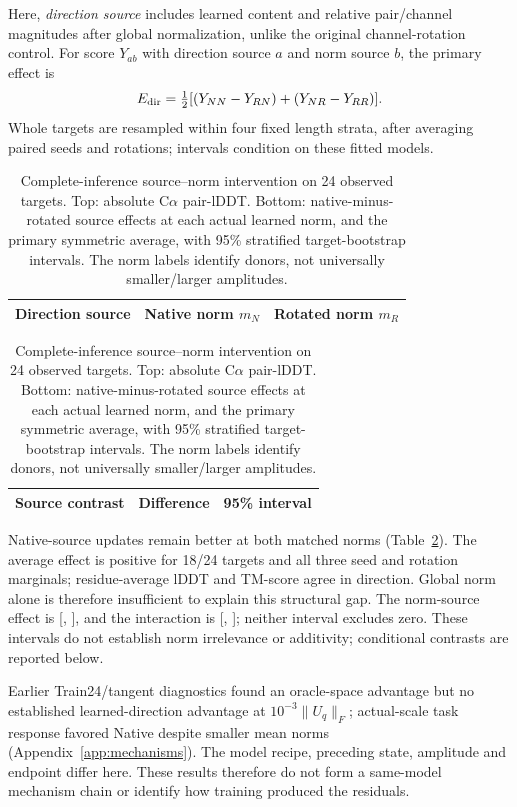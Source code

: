 Here, \emph{direction source} includes learned content and relative pair/channel
magnitudes after global normalization, unlike the original channel-rotation
control. For score $Y_{ab}$ with direction source $a$ and norm source $b$, the
primary effect is
\begin{equation}
 E_{\rm dir}=\tfrac12[(Y_{NN}-Y_{RN})+(Y_{NR}-Y_{RR})].
 \label{eq:norm_source}
\end{equation}
Whole targets are resampled within four fixed length strata, after averaging
paired seeds and rotations; intervals condition on these fitted models.

\begin{table}[t]
\caption{Complete-inference source--norm intervention on 24 observed targets.
Top: absolute C$\alpha$ pair-lDDT. Bottom: native-minus-rotated source effects
at each actual learned norm, and the primary symmetric average, with 95\%
stratified target-bootstrap intervals. The norm labels identify donors, not
universally smaller/larger amplitudes.}
\label{tab:norm_cross}\centering\small
\begin{tabular}{lrr}\toprule
Direction source & Native norm $m_N$ & Rotated norm $m_R$ \\\midrule

\end{tabular}
\par\smallskip
\begin{tabular}{lrr}\toprule
Source contrast & Difference & 95\% interval \\\midrule

\end{tabular}
\end{table}

Native-source updates remain better at both matched norms
(Table~\ref{tab:norm_cross}). The average effect is positive for 18/24 targets
and all three seed and rotation marginals; residue-average lDDT and TM-score
agree in direction. Global norm alone is therefore insufficient to explain
this structural gap. The norm-source effect is 
[, ], and the interaction is
 [, ]; neither interval excludes zero.
These intervals do not establish norm irrelevance or additivity; conditional
contrasts are reported below.

Earlier Train24/tangent diagnostics found an oracle-space advantage but no
established learned-direction advantage at $10^{-3}\|U_q\|_F$; actual-scale
task response favored Native despite smaller mean norms
(Appendix~\ref{app:mechanisms}). The model recipe, preceding state, amplitude and
endpoint differ here. These results therefore do not form a same-model mechanism
chain or identify how training produced the residuals.


